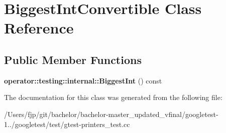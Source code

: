 \hypertarget{class_biggest_int_convertible}{}\section{Biggest\+Int\+Convertible Class Reference}
\label{class_biggest_int_convertible}
\subsection*{Public Member Functions}
\begin{DoxyCompactItemize}
\item 
\mbox{\label{class_biggest_int_convertible_aa3dc4bbff87d412758b9adbefa19c6d0}} 
{\bfseries operator\+::testing\+::internal\+::\+Biggest\+Int} () const
\end{DoxyCompactItemize}


The documentation for this class was generated from the following file\+:\begin{DoxyCompactItemize}
\item 
/\+Users/fjp/git/bachelor/bachelor-\/master\+\_\+updated\+\_\+vfinal/googletest-\/1../googletest/test/gtest-\/printers\+\_\+test.\+cc\end{DoxyCompactItemize}
